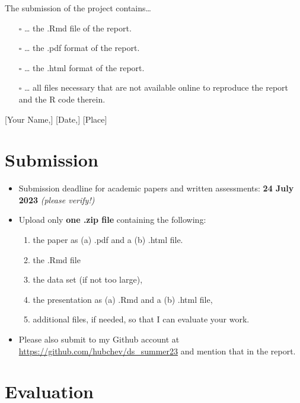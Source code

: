 \documentclass[
  12pt,
]{article}
\providecommand{\tightlist}{%
  \setlength{\itemsep}{0pt}\setlength{\parskip}{0pt}}
\begin{document}
The submission of the project contains\ldots{}

\begin{itemize}
\tightlist
\item[$\square$]
  \ldots{} the .Rmd file of the
  report.
\item[$\square$]
  \ldots{} the .pdf format of the report.
\item[$\square$]
  \ldots{} the .html format of the report.
\item[$\square$]
  \ldots{} all files necessary that are not available online to reproduce the report and the R code therein.
\end{itemize}

{[}Your Name,{]} {[}Date,{]} {[}Place{]}

\hypertarget{submission}{%
\section{Submission}\label{submission}}

\begin{itemize}
\tightlist
\item
  Submission deadline for academic papers and written assessments: \textbf{24 July 2023} \emph{(please verify!)}
\item
  Upload only \textbf{one .zip file} containing the following:

  \begin{enumerate}
  \def\labelenumi{\arabic{enumi}.}
  \tightlist
  \item
    the paper as (a) .pdf and a (b) .html file.
  \item
    the .Rmd file
  \item
    the data set (if not too large),
  \item
    the presentation as (a) .Rmd and a (b) .html file,
  \item
    additional files, if needed, so that I can evaluate your work.
  \end{enumerate}
\item
  Please also submit to my Github account at \url{https://github.com/hubchev/ds_summer23} and mention that in the report.
\end{itemize}

\hypertarget{evaluation}{%
\section{Evaluation}\label{evaluation}}
\end{document}
